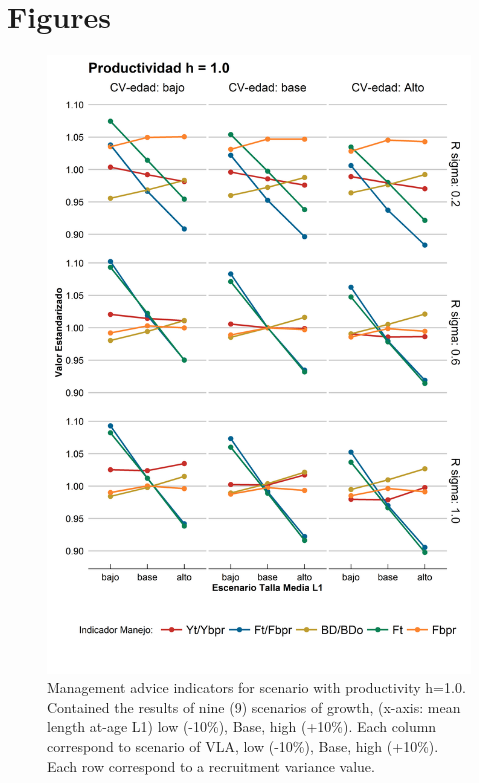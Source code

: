\documentclass[11pt,letterpaper,]{article}
\begin{document}
\clearpage
\section{Figures}


\begin{figure}[ht]
	\begin{center}
\includegraphics[width=0.70\columnwidth]{figures/steepness-10-var.png}
  \end{center}
\caption{Management advice indicators for scenario with productivity h=1.0. Contained the results of nine (9) scenarios of growth, (x-axis: mean length at-age L1) low (-10\%), Base, high (+10\%). Each column correspond to scenario of VLA, low (-10\%), Base, high (+10\%). Each row correspond to a recruitment variance value.}
\label{figure1}
\end{figure}
\end{document}
